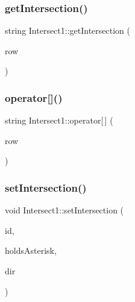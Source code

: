 \hypertarget{class_intersect1_ad81b2fa630cd88de4c9ddf5665d9fda0}{}\label{class_intersect1_ad81b2fa630cd88de4c9ddf5665d9fda0} 
\subsubsection{\texorpdfstring{get\+Intersection()}{getIntersection()}}
{\footnotesize\ttfamily string Intersect1\+::get\+Intersection (\begin{DoxyParamCaption}\item[{int}]{row }\end{DoxyParamCaption})}

\hypertarget{class_intersect1_a8374a2e3221cca364567eec502a0eca0}{}\label{class_intersect1_a8374a2e3221cca364567eec502a0eca0} 
\subsubsection{\texorpdfstring{operator[]()}{operator[]()}}
{\footnotesize\ttfamily string Intersect1\+::operator\mbox{[}$\,$\mbox{]} (\begin{DoxyParamCaption}\item[{int}]{row }\end{DoxyParamCaption})}

\hypertarget{class_intersect1_a3433881e13c770732b941f2dbe33ab83}{}\label{class_intersect1_a3433881e13c770732b941f2dbe33ab83} 
\subsubsection{\texorpdfstring{set\+Intersection()}{setIntersection()}}
{\footnotesize\ttfamily void Intersect1\+::set\+Intersection (\begin{DoxyParamCaption}\item[{char}]{id,  }\item[{bool}]{holds\+Asterisk,  }\item[{\hyperlink{vehicle_8h_ab81942edaa6e6c3f12551c3d0e511b85}{Vehicle\+Dir}}]{dir }\end{DoxyParamCaption})}



